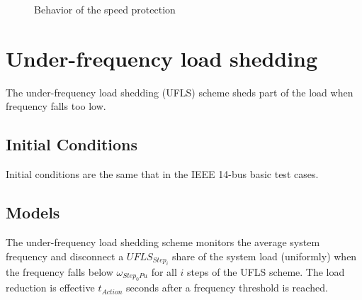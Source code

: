 \documentclass[a4paper, 12pt]{report}
\begin{document}
\begin{figure}[H]
\caption{Behavior of the speed protection}
\end{figure}

\newpage
\section{Under-frequency load shedding}
\label{UFLS}

The under-frequency load shedding (UFLS) scheme sheds part of the load when frequency falls too low.

\subsection{Initial Conditions}

Initial conditions are the same that in the IEEE 14-bus basic test cases.

\subsection{Models}

The under-frequency load shedding scheme monitors the average system frequency and disconnect a \(UFLS_{Step_i}\) share of the system load (uniformly) when the frequency falls below \(\omega_{Step_0{Pu}}\) for all \(i\) steps of the UFLS scheme. The load reduction is effective \(t_{Action}\) seconds after a frequency threshold is reached.
\end{document}
